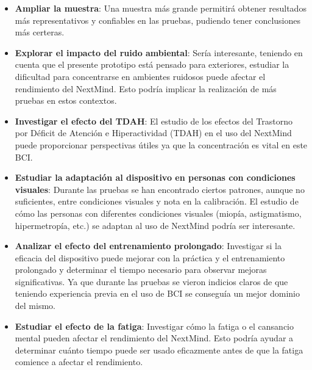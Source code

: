 \begin{itemize}
\item \textbf{Ampliar la muestra}: Una muestra más grande permitirá obtener resultados más representativos y confiables en las pruebas, pudiendo tener conclusiones más certeras.

\item \textbf{Explorar el impacto del ruido ambiental}: Sería interesante, teniendo en cuenta que el presente prototipo está pensado para exteriores, estudiar la dificultad para concentrarse en ambientes ruidosos puede afectar el rendimiento del NextMind. Esto podría implicar la realización de más pruebas en estos contextos.

\item \textbf{Investigar el efecto del TDAH}: El estudio de los efectos del Trastorno por Déficit de Atención e Hiperactividad (TDAH) en el uso del NextMind puede proporcionar perspectivas útiles ya que la concentración es vital en este BCI.

\item \textbf{Estudiar la adaptación al dispositivo en personas con condiciones visuales}: 
Durante las pruebas se han encontrado ciertos patrones, aunque no suficientes, entre condiciones visuales y nota en la calibración. El estudio de cómo las personas con diferentes condiciones visuales (miopía, astigmatismo, hipermetropía, etc.) se adaptan al uso de NextMind podría ser interesante.

\item \textbf{Analizar el efecto del entrenamiento prolongado}: Investigar si la eficacia del dispositivo puede mejorar con la práctica y el entrenamiento prolongado y determinar el tiempo necesario para observar mejoras significativas. Ya que durante las pruebas se vieron indicios claros de que teniendo experiencia previa en el uso de BCI se conseguía un mejor dominio del mismo.

\item \textbf{Estudiar el efecto de la fatiga}: Investigar cómo la fatiga o el cansancio mental pueden afectar el rendimiento del NextMind. Esto podría ayudar a determinar cuánto tiempo puede ser usado eficazmente antes de que la fatiga comience a afectar el rendimiento.

\end{itemize}
